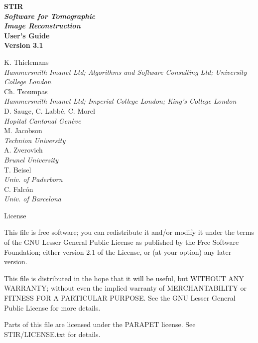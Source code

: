 \documentclass{article}
\begin{document}
\begin{spacing}{2}
\begin{center}

\textbf{
{\Huge  STIR} 
\huge
\\[1cm]
\textit{ Software for  Tomographic \\ Image Reconstruction}
}
\\[3cm]

\textbf{{\huge User's Guide\\
 Version 3.1}}
\end{center}

\end{spacing}

\large 

\noindent 
K. Thielemans \\
{\it \small Hammersmith Imanet Ltd; Algorithms and Software Consulting Ltd; University College London}\\
Ch. Tsoumpas\\ 
{\it \small Hammersmith Imanet Ltd; Imperial College London; King's College London}\\
D. Sauge, C. Labb\'e, C. Morel \\
{\it \small Hopital Cantonal Gen\`eve}\\
M. Jacobson \\
{\it \small Technion University}\\
A. Zverovich \\
{\it \small Brunel University} \\
T. Beisel \\
{\it \small Univ. of Paderborn} \\
C. Falc\'{o}n \\
{\it \small Univ. of Barcelona}

\begin{center}
License
\end{center}
    This file is free software; you can redistribute it and/or modify
    it under the terms of the GNU Lesser General Public License as published by
    the Free Software Foundation; either version 2.1 of the License, or
    (at your option) any later version.

    This file is distributed in the hope that it will be useful,
    but WITHOUT ANY WARRANTY; without even the implied warranty of
    MERCHANTABILITY or FITNESS FOR A PARTICULAR PURPOSE.  See the
    GNU Lesser General Public License for more details.

    Parts of this file are licensed under the PARAPET license.     
    See STIR/LICENSE.txt for details.
\end{document}
